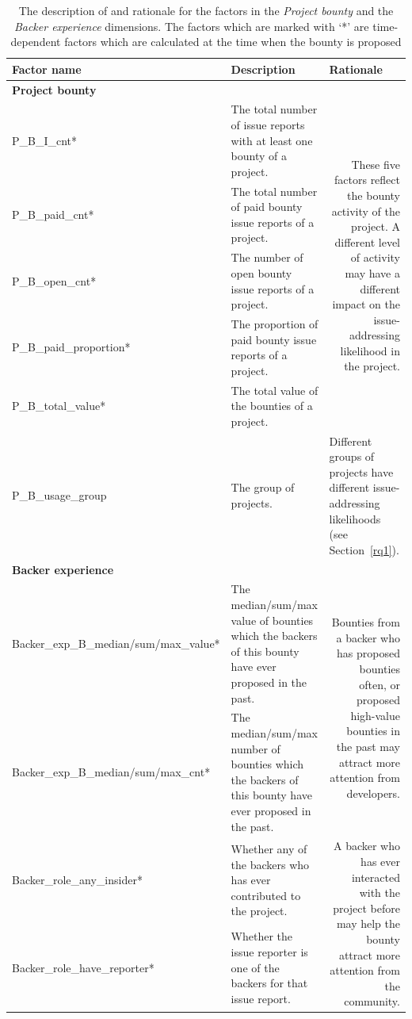 \begin{table}[ ]
\centering
\caption{The description of and rationale for the factors in the \emph{Project bounty} and the \emph{Backer experience} dimensions. The factors which are marked with `*' are  time-dependent factors which are calculated at the time when the bounty is proposed}
\label{tab:factors2}

     \begin{tabular}{p{10em}p{29em}p{21em}}
     \toprule
     \multicolumn{1}{l}{\textbf{Factor name}}  & \textbf{Description} & \multicolumn{1}{p{21em}}{\textbf{Rationale}} \\
     \midrule
     \multicolumn{3}{p{30em}}{\textbf{Project bounty}}\\
     \midrule
     P\_B\_I\_cnt*                     &  The total number of issue reports with at least one bounty of a project.  & \multicolumn{1}{r}{\multirow{5}[-5]{21em}{\parbox{21em}{These five factors reflect the bounty activity of the project. A different level of activity may have a different impact on the issue-addressing likelihood in the project.}}} \\
     P\_B\_paid\_cnt* & The total number of paid bounty issue reports of a project. &  \\
     P\_B\_open\_cnt*     &  The number of open bounty issue reports of a project.  &\\
     P\_B\_paid\_proportion* & The proportion of paid bounty issue reports of a project. &  \\
     P\_B\_total\_value* & The total value of the bounties of a project. &  \\
\midrule
      P\_B\_usage\_group                    &   The group of projects.                                                                                  & \multicolumn{1}{p{21em}}{Different groups of projects have different issue-addressing likelihoods (see Section~\ref{rq1}).} \\
     \midrule
     \multicolumn{3}{p{30em}}{\textbf{Backer experience}}\\
     \midrule
     Backer\_exp\_B\_median/sum/max\_value* & The median/sum/max value of bounties which the backers of this bounty have ever proposed in the past. & \multicolumn{1}{r}{\multirow{2}[1]{21em}{\parbox{21em}{Bounties from a backer who has proposed bounties often, or proposed high-value bounties in the past may attract more attention from developers.}}} t\\
     Backer\_exp\_B\_median/sum/max\_cnt* & The median/sum/max number of bounties which the backers of this bounty have ever proposed in the past. &  \\
     \midrule
     Backer\_role\_any\_insider* & Whether any of the backers who has ever contributed to the project.  & \multicolumn{1}{r}{\multirow{2}[1]{21em}{\parbox{21em}{A backer who has ever interacted with the project before may help the bounty attract more attention from the community.}}} \bigstrut\\
Backer\_role\_have\_reporter* & Whether the issue reporter is one of the backers for that issue report.\\
     \midrule


\end{tabular}
\end{table}
